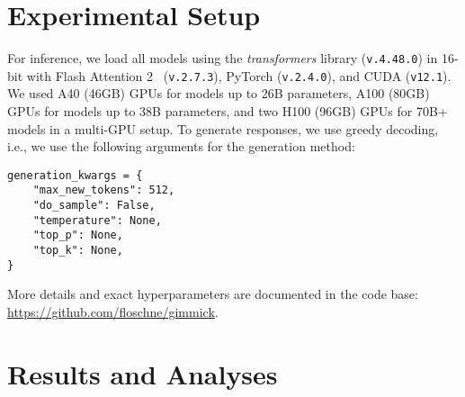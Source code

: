 \onecolumn
\section{Experimental Setup}
\label{appendix:sec:setup}
%
For inference, we load all models using the \textit{transformers} library (\texttt{v.4.48.0}) in 16-bit with Flash Attention 2~\cite{dao2022flashattention,dao2023flashattention2} (\texttt{v.2.7.3}), PyTorch (\texttt{v.2.4.0}), and CUDA (\texttt{v12.1}).
%
We used A40 (46GB) GPUs for models up to 26B parameters, A100 (80GB) GPUs for models up to 38B parameters, and two H100 (96GB) GPUs for 70B+ models in a multi-GPU setup.
%
To generate responses, we use greedy decoding, i.e., we use the following arguments for the generation method:
%
\begin{listing}[H]
\begin{verbatim}
generation_kwargs = {
    "max_new_tokens": 512,
    "do_sample": False,
    "temperature": None,
    "top_p": None,
    "top_k": None,
}
\end{verbatim}
\end{listing}
%

More details and exact hyperparameters are documented in the code base: \href{https://github.com/floschne/gimmick}{https://github.com/floschne/gimmick}.

\section{Results and Analyses}
\label{appendix:sec:analyses}
%

%

%

%

%